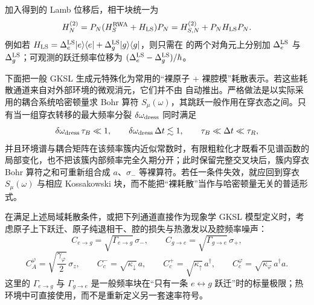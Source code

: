 加入得到的 Lamb 位移后，相干块统一为
\begin{equation}
H_N^{(2)}
=P_N(H_S^{\rm RWA}+H_{\rm LS})P_N
=H_{S,N}^{(2)}+P_NH_{\rm LS}P_N.
\label{eq:phys-oqs-hn2-full}
\end{equation}
例如若 $H_{\rm LS}=\Delta_e^{\rm LS}|e\rangle\langle e|+\Delta_g^{\rm LS}|g\rangle\langle g|$，则只需在 的两个对角元上分别加 $\Delta_e^{\rm LS}$ 与 $\Delta_g^{\rm LS}$；可观测的跃迁频率位移为 $(\Delta_e^{\rm LS}-\Delta_g^{\rm LS})/\hbar$。

下面把一般 GKSL 生成元特殊化为常用的“裸原子 + 裸腔模”耗散表示。若这些耗散通道来自对外部环境的微观消元，它们并不由 自动推出。严格做法是以实际采用的耦合系统哈密顿量求 Bohr 算符 $S_\mu(\omega)$，其跳跃一般作用在穿衣态之间。只有当一组穿衣转移的最大频率分裂 $\delta\omega_{\rm dress}$ 同时满足
\begin{equation}
\delta\omega_{\rm dress}\,\tau_B\ll1,
\qquad
\delta\omega_{\rm dress}\,\Delta t\lesssim1,
\qquad
\tau_B\ll\Delta t\ll\tau_R,
\label{eq:phys-oqs-local-dissipator-condition}
\end{equation}
并且环境谱与耦合矩阵在该频率簇内近似常数时，有限粗粒化才既看不见谱函数的局部变化，也不把该簇内部频率完全久期分开；此时保留完整交叉块后，簇内穿衣 Bohr 算符之和可重新组合成 $a$、$\sigma_-$ 等裸算符。若任一条件失效，就应回到穿衣 $S_\mu(\omega)$ 与相应 Kossakowski 块，而不能把“裸耗散”当作与哈密顿量无关的普适形式。

在满足上述局域耗散条件，或把下列通道直接作为现象学 GKSL 模型定义时，考虑原子上下跃迁、原子纯退相干、腔的损失与热激发以及腔频率噪声：
\[
C_{e\to g}=\sqrt{\Gamma_{e\to g}}\,\sigma_-,
\qquad
C_{g\to e}=\sqrt{\Gamma_{g\to e}}\,\sigma_+,
\]
\[
C_A^\varphi=\sqrt{\frac{\gamma_\varphi}{2}}\,\sigma_z,
\qquad
C_c^-=\sqrt{\kappa_\downarrow}\,a,
\qquad
C_c^+=\sqrt{\kappa_\uparrow}\,a^\dagger,
\qquad
C_c^\varphi=\sqrt{\kappa_\varphi}\,a^\dagger a.
\]
这里的 $\Gamma_{e\to g}$ 与 $\Gamma_{g\to e}$ 是一般频率块在“只有一条 $e\leftrightarrow g$ 跃迁”时的标量极限；热环境中可直接使用，而不是重新定义另一套速率符号。

